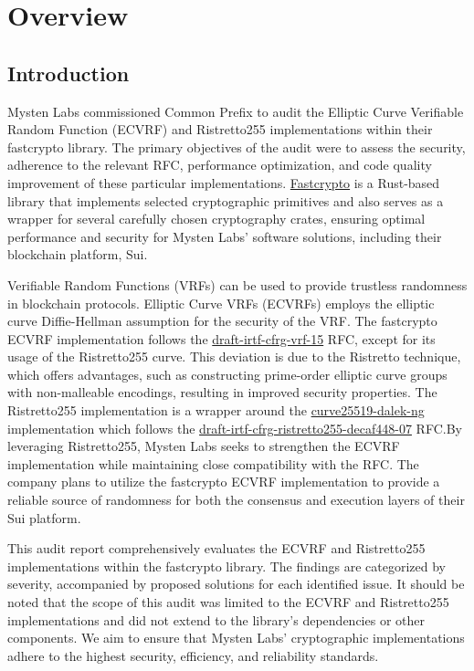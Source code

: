 \section{Overview}
\subsection{Introduction}
Mysten Labs commissioned Common Prefix to audit the Elliptic Curve Verifiable Random Function (ECVRF) and Ristretto255 implementations within their fastcrypto library. The primary objectives of the audit were to assess the security, adherence to the relevant RFC, performance optimization, and code quality improvement of these particular implementations. \href{https://github.com/MystenLabs/fastcrypto}{Fastcrypto} is a Rust-based library that implements selected cryptographic primitives and also serves as a wrapper for several carefully chosen cryptography crates, ensuring optimal performance and security for Mysten Labs' software solutions, including their blockchain platform, Sui.

Verifiable Random Functions (VRFs) can be used to provide trustless randomness in blockchain protocols\cite{praos,algorand}. Elliptic Curve VRFs (ECVRFs) employs the elliptic curve Diffie-Hellman assumption for the security of the VRF\cite{vrf}. The fastcrypto ECVRF implementation follows the \href{https://datatracker.ietf.org/doc/draft-irtf-cfrg-vrf/}{draft-irtf-cfrg-vrf-15} RFC\cite{vrf-rfc}, except for its usage of the Ristretto255 curve. This deviation is due to the Ristretto technique, which offers advantages, such as constructing prime-order elliptic
curve groups with non-malleable encodings, resulting in improved security properties\cite{ristretto255-rfc}. The Ristretto255 implementation is a wrapper around the \href{https://github.com/zkcrypto/curve25519-dalek-ng}{curve25519-dalek-ng} implementation which follows the \href{https://datatracker.ietf.org/doc/draft-irtf-cfrg-ristretto255-decaf448/}{draft-irtf-cfrg-ristretto255-decaf448-07} RFC\cite{ristretto255-rfc}.By leveraging Ristretto255, Mysten Labs seeks to strengthen the ECVRF implementation while maintaining close compatibility with the RFC. The company plans to utilize the fastcrypto ECVRF implementation to provide a reliable source of randomness for both the consensus and execution layers of their Sui platform.

This audit report comprehensively evaluates the ECVRF and Ristretto255 implementations within the fastcrypto library. The findings are categorized by severity, accompanied by proposed solutions for each identified issue. It should be noted that the scope of this audit was limited to the ECVRF and Ristretto255 implementations and did not extend to the library's dependencies or other components. We aim to ensure that Mysten Labs' cryptographic implementations adhere to the highest security, efficiency, and reliability standards.

